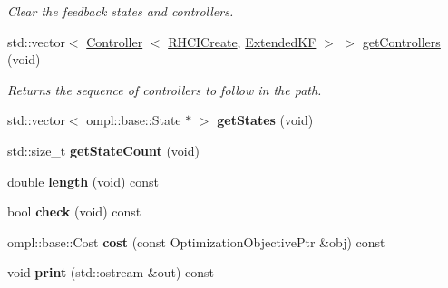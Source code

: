 \begin{DoxyCompactItemize}
\begin{DoxyCompactList}\small\item\em \-Clear the feedback states and controllers. \end{DoxyCompactList}\item 
\hypertarget{class_feedback_path_a3bd4f1f2f1a6eb8ff92bbbb2cc25f1fb}{std\-::vector$<$ \hyperlink{class_controller}{\-Controller}\*
$<$ \hyperlink{class_r_h_c_i_create}{\-R\-H\-C\-I\-Create}, \hyperlink{class_extended_k_f}{\-Extended\-K\-F} $>$ $>$ \hyperlink{class_feedback_path_a3bd4f1f2f1a6eb8ff92bbbb2cc25f1fb}{get\-Controllers} (void)}\label{class_feedback_path_a3bd4f1f2f1a6eb8ff92bbbb2cc25f1fb}

\begin{DoxyCompactList}\small\item\em \-Returns the sequence of controllers to follow in the path. \end{DoxyCompactList}\item 
\hypertarget{class_feedback_path_af41045c60e5e71c5da57653beece5101}{std\-::vector$<$ ompl\-::base\-::\-State $\ast$ $>$ {\bfseries get\-States} (void)}\label{class_feedback_path_af41045c60e5e71c5da57653beece5101}

\item 
\hypertarget{class_feedback_path_aa646edaa72a6c85f0a8fccb1da2154a9}{std\-::size\-\_\-t {\bfseries get\-State\-Count} (void)}\label{class_feedback_path_aa646edaa72a6c85f0a8fccb1da2154a9}

\item 
\hypertarget{class_feedback_path_a9353544ce7254a38630e28a88d18818a}{double {\bfseries length} (void) const }\label{class_feedback_path_a9353544ce7254a38630e28a88d18818a}

\item 
\hypertarget{class_feedback_path_a126854606064277c1d53ed50dcba14e3}{bool {\bfseries check} (void) const }\label{class_feedback_path_a126854606064277c1d53ed50dcba14e3}

\item 
\hypertarget{class_feedback_path_ac49ad2a8e1ddb5697294eae251afc54b}{ompl\-::base\-::\-Cost {\bfseries cost} (const \-Optimization\-Objective\-Ptr \&obj) const }\label{class_feedback_path_ac49ad2a8e1ddb5697294eae251afc54b}

\item 
\hypertarget{class_feedback_path_a0d79c8f6d98acf01cc145244fdaf2f78}{void {\bfseries print} (std\-::ostream \&out) const }\label{class_feedback_path_a0d79c8f6d98acf01cc145244fdaf2f78}

\end{DoxyCompactItemize}
